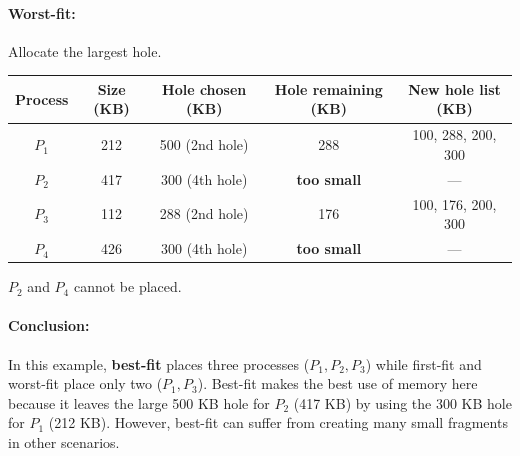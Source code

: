\documentclass[11pt]{article}
\begin{document}
\begin{corrige}
\paragraph{Worst-fit:} Allocate the largest hole.
\begin{center}
\begin{tabular}{|c|c|c|c|c|}
\hline
Process & Size (KB) & Hole chosen (KB) & Hole remaining (KB) & New hole list (KB) \\
\hline
$P_1$ & 212 & 500 (2nd hole) & 288 & 100, 288, 200, 300 \\
$P_2$ & 417 & 300 (4th hole) & \textbf{too small} & — \\
$P_3$ & 112 & 288 (2nd hole) & 176 & 100, 176, 200, 300 \\
$P_4$ & 426 & 300 (4th hole) & \textbf{too small} & — \\
\hline
\end{tabular}
\end{center}
$P_2$ and $P_4$ cannot be placed.

\paragraph{Conclusion:} In this example, \textbf{best-fit} places three processes ($P_1, P_2, P_3$) while first-fit and worst-fit place only two ($P_1, P_3$). Best-fit makes the best use of memory here because it leaves the large 500 KB hole for $P_2$ (417 KB) by using the 300 KB hole for $P_1$ (212 KB). However, best-fit can suffer from creating many small fragments in other scenarios.
\end{corrige}
\end{document}
